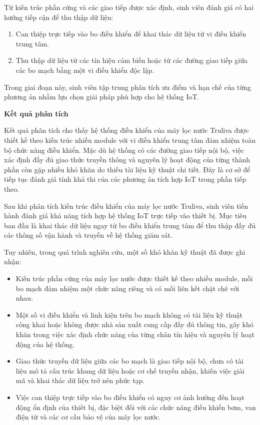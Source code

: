 Từ kiến trúc phần cứng và các giao tiếp được xác định, sinh viên đánh giá có hai hướng tiếp cận để thu thập dữ liệu:

\begin{enumerate}
    \item Can thiệp trực tiếp vào bo điều khiển để khai thác dữ liệu từ vi điều khiển trung tâm.
    \item Thu thập dữ liệu từ các tín hiệu cảm biến hoặc từ các đường giao tiếp giữa các bo mạch bằng một vi điều khiển độc lập.
\end{enumerate}

Trong giai đoạn này, sinh viên tập trung phân tích ưu điểm và hạn chế của từng phương án nhằm lựa chọn giải pháp phù hợp cho hệ thống IoT.

\vspace{0.5em}

\textbf{Kết quả phân tích}

Kết quả phân tích cho thấy hệ thống điều khiển của máy lọc nước Truliva được thiết kế theo kiến trúc nhiều module với vi điều khiển trung tâm đảm nhiệm toàn bộ chức năng điều khiển. Mặc dù hệ thống có các đường giao tiếp nội bộ, việc xác định đầy đủ giao thức truyền thông và nguyên lý hoạt động của từng thành phần còn gặp nhiều khó khăn do thiếu tài liệu kỹ thuật chi tiết. Đây là cơ sở để tiếp tục đánh giá tính khả thi của các phương án tích hợp IoT trong phần tiếp theo.

Sau khi phân tích kiến trúc điều khiển của máy lọc nước Truliva, sinh viên tiến hành đánh giá khả năng tích hợp hệ thống IoT trực tiếp vào thiết bị. Mục tiêu ban đầu là khai thác dữ liệu ngay từ bo điều khiển trung tâm để thu thập đầy đủ các thông số vận hành và truyền về hệ thống giám sát.

Tuy nhiên, trong quá trình nghiên cứu, một số khó khăn kỹ thuật đã được ghi nhận:

\begin{itemize}
    \item Kiến trúc phần cứng của máy lọc nước được thiết kế theo nhiều module, mỗi bo mạch đảm nhiệm một chức năng riêng và có mối liên kết chặt chẽ với nhau.
    
    \item Một số vi điều khiển và linh kiện trên bo mạch không có tài liệu kỹ thuật công khai hoặc không được nhà sản xuất cung cấp đầy đủ thông tin, gây khó khăn trong việc xác định chức năng của từng chân tín hiệu và nguyên lý hoạt động của hệ thống.
    
    \item Giao thức truyền dữ liệu giữa các bo mạch là giao tiếp nội bộ, chưa có tài liệu mô tả cấu trúc khung dữ liệu hoặc cơ chế truyền nhận, khiến việc giải mã và khai thác dữ liệu trở nên phức tạp.
    
    \item Việc can thiệp trực tiếp vào bo điều khiển có nguy cơ ảnh hưởng đến hoạt động ổn định của thiết bị, đặc biệt đối với các chức năng điều khiển bơm, van điện từ và các cơ cấu bảo vệ của máy lọc nước.
\end{itemize}

